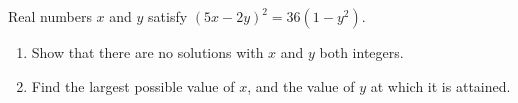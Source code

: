 Real numbers $x$ and $y$ satisfy $(5x-2y)^2=36(1-y^2)$.
\begin{enumerate}
\item[(a)] Show that there are no solutions with $x$ and $y$ both integers.
\item[(b)] Find the largest possible value of $x$, and the value of $y$ at which it is attained.
\end{enumerate}
